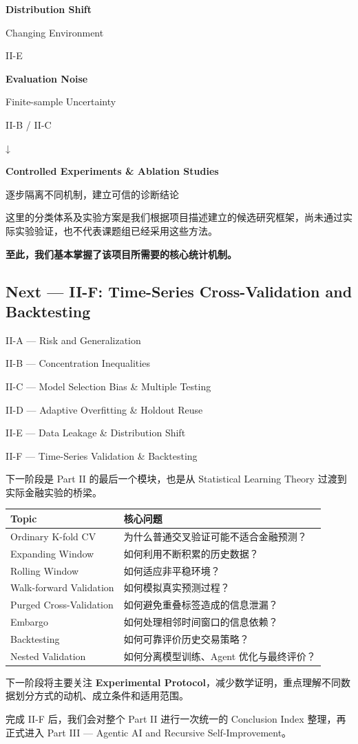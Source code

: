 \textbf{Distribution Shift}

Changing Environment

II-E

\textbf{Evaluation Noise}

Finite-sample Uncertainty

II-B / II-C

↓

\textbf{Controlled Experiments \& Ablation Studies}

逐步隔离不同机制，建立可信的诊断结论

这里的分类体系及实验方案是我们根据项目描述建立的候选研究框架，尚未通过实际实验验证，也不代表课题组已经采用这些方法。

\textbf{至此，我们基本掌握了该项目所需要的核心统计机制。}

\hypertarget{part-2-23-0001-next-ii-f-time-series-cross-validation-and-backtesting}{%
\subsection{Next --- II-F: Time-Series Cross-Validation and Backtesting}\label{part-2-23-0001-next-ii-f-time-series-cross-validation-and-backtesting}}

II-A --- Risk and Generalization

II-B --- Concentration Inequalities

II-C --- Model Selection Bias \& Multiple Testing

II-D --- Adaptive Overfitting \& Holdout Reuse

II-E --- Data Leakage \& Distribution Shift

II-F --- Time-Series Validation \& Backtesting

下一阶段是 Part II 的最后一个模块，也是从 Statistical Learning Theory 过渡到实际金融实验的桥梁。

\begin{readertable}
\begin{longtable}[]{@{}
  >{\raggedright\arraybackslash}p{}
  >{\raggedright\arraybackslash}p{}@{}}
\toprule
Topic & 核心问题 \\
\midrule
\endhead
Ordinary K-fold CV & 为什么普通交叉验证可能不适合金融预测？ \\
Expanding Window & 如何利用不断积累的历史数据？ \\
Rolling Window & 如何适应非平稳环境？ \\
Walk-forward Validation & 如何模拟真实预测过程？ \\
Purged Cross-Validation & 如何避免重叠标签造成的信息泄漏？ \\
Embargo & 如何处理相邻时间窗口的信息依赖？ \\
Backtesting & 如何可靠评价历史交易策略？ \\
Nested Validation & 如何分离模型训练、Agent 优化与最终评价？ \\
\bottomrule
\end{longtable}
\end{readertable}

下一阶段将主要关注 \textbf{Experimental Protocol}，减少数学证明，重点理解不同数据划分方式的动机、成立条件和适用范围。

完成 II-F 后，我们会对整个 Part II 进行一次统一的 Conclusion Index 整理，再正式进入 Part III --- Agentic AI and Recursive Self-Improvement。
